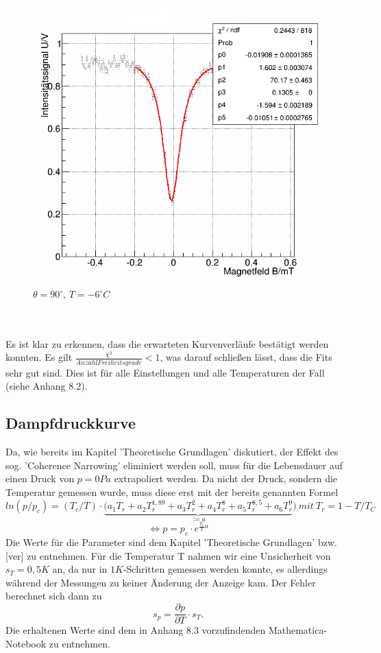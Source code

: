 ~\\
\begin{figure}[h]
\begin{center}
\includegraphics[scale=0.3]{Bilder/90_m6}
\caption{$\theta=90^{\circ}$, $T=-6^{\circ}C$}
\end{center}
\end{figure}
~\\
~\\
Es ist klar zu erkennen, dass die erwarteten Kurvenverläufe bestätigt werden konnten. Es gilt $\frac{\chi^{2}}{Anzahl Freiheitsgrade}<1$, was darauf schließen lässt, dass die Fits sehr gut sind. Dies ist für alle Einstellungen und alle Temperaturen der Fall (siehe Anhang $8.2$).
\subsection{Dampfdruckkurve}
Da, wie bereits im Kapitel 'Theoretische Grundlagen' diskutiert, der Effekt des sog. 'Coherence Narrowing' eliminiert werden soll, muss für die Lebensdauer auf einen Druck von $p=0Pa$ extrapoliert werden. Da nicht der Druck, sondern die Temperatur gemessen wurde, muss diese erst mit der bereits genannten Formel \[ln(p/p_{c})=(T_{c}/T)\cdot\underbrace{(a_{1}T_{r}+a_{2}T_{r}^{1,89}+a_{3}T_{r}^{2}+a_{4}T_{r}^{8}+a_{5}T_{r}^{8,5}+a_{6}T_{r}^{9}}_{:=a})~mit~T_{r}=1-T/T_{C}\]
\[\Leftrightarrow p=p_{c}\cdot e^{\frac{T_{c}}{T}a}\]
Die Werte für die Parameter sind dem Kapitel 'Theoretische Grundlagen' bzw. [ver] zu entnehmen. Für die Temperatur T nahmen wir eine Unsicherheit von $s_{T}=0,5K$ an, da nur in $1K$-Schritten gemessen werden konnte, es allerdings während der Messungen zu keiner Änderung der Anzeige kam. Der Fehler berechnet sich dann zu \[s_{p}=\frac{\partial p}{\partial T}\cdot s_{T}.\] Die erhaltenen Werte sind dem in Anhang $8.3$ vorzufindenden Mathematica-Notebook zu entnehmen.
